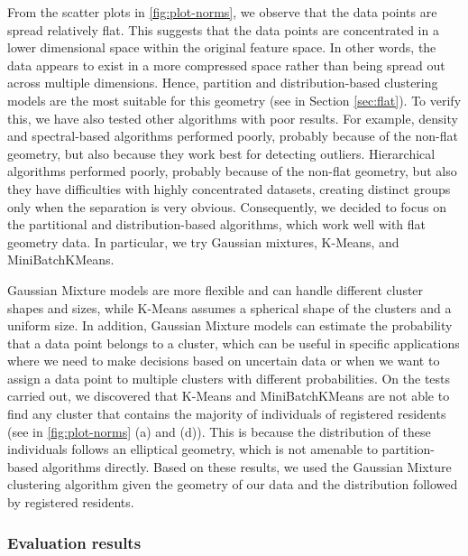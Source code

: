 From the scatter plots in \cref{fig:plot-norms}, we observe that the data points are spread relatively flat. This suggests that the data points are concentrated in a lower dimensional space within the original feature space. In other words, the data appears to exist in a more compressed space rather than being spread out across multiple dimensions. Hence, partition and distribution-based clustering models are the most suitable for this geometry (see in Section \ref{sec:flat}). To verify this, we have also tested other algorithms with poor results. For example, density and spectral-based algorithms performed poorly, probably because of the non-flat geometry, but also because they work best for detecting outliers. Hierarchical algorithms performed poorly, probably because of the non-flat geometry, but also they have difficulties with highly concentrated datasets, creating distinct groups only when the separation is very obvious. Consequently, we decided to focus on the partitional and distribution-based algorithms, which work well with flat geometry data. In particular, we try Gaussian mixtures, K-Means, and MiniBatchKMeans.

Gaussian Mixture models are more flexible and can handle different cluster shapes and sizes, while K-Means assumes a spherical shape of the clusters and a uniform size. In addition, Gaussian Mixture models can estimate the probability that a data point belongs to a cluster, which can be useful in specific applications where we need to make decisions based on uncertain data or when we want to assign a data point to multiple clusters with different probabilities. On the tests carried out, we discovered that K-Means and MiniBatchKMeans are not able to find any cluster that contains the majority of individuals of registered residents (see in \cref{fig:plot-norms} (a) and (d)). This is because the distribution of these individuals follows an elliptical geometry, which is not amenable to partition-based algorithms directly. Based on these results, we used the Gaussian Mixture clustering algorithm given the geometry of our data and the distribution followed by registered residents. 

\subsubsection*{Evaluation results}

